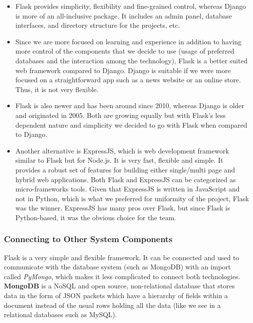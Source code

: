 \documentclass[titlepage, 12pt]{article}
\begin{document}
\begin{itemize}
    \item Flask provides simplicity, flexibility and fine-grained control, whereas Django is more of an all-inclusive package. It includes an admin panel, database interfaces, and directory structure for the projects, etc.
    \item Since we are more focused on learning and experience in addition to having more control of the components that we decide to use (usage of preferred databases and the interaction among the technology), Flask is a better suited web framework compared to Django. Django is suitable if we were more focused on a straightforward app such as a news website or an online store. Thus, it is not very flexible.
    \item Flask is also newer and has been around since 2010, whereas Django is older and originated in 2005. Both are growing equally but with Flask’s less dependent nature and simplicity we decided to go with Flask when compared to Django.
    \item Another alternative is ExpressJS, which is web development framework similar to Flask but for Node.js. It is very fast, flexible and simple. It provides a robust set of features for building either single/multi page and hybrid web applications. Both Flask and ExpressJS can be categorized as micro-frameworks tools. Given that ExpressJS is written in JavaScript and not in Python, which is what we preferred for uniformity of the project, Flask was the winner. ExpressJS has many pros over Flask, but since Flask is Python-based, it was the obvious choice for the team.

\end{itemize}

\subsubsection{Connecting to Other System Components}

Flask is a very simple and flexible framework. It can be connected and used to communicate with the database system (such as MongoDB) with an import called  \emph{PyMongo}, which makes it less complicated to connect both technologies. \textbf{MongoDB} is a NoSQL and open source, non-relational database that stores data in the form of JSON packets which have a hierarchy of fields within a document instead of the usual rows holding all the data (like we see in a relational databases such as MySQL).
\end{document}
